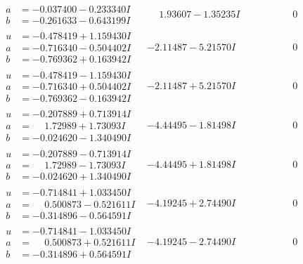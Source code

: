 \documentclass[1p]{elsarticle_modified}
\theoremstyle{definition}
\begin{document}
$$\begin{array}{c|c|c}
\begin{aligned}
a &= -0.037400 - 0.233340 I \\
b &= -0.261633 - 0.643199 I\end{aligned}
 & \phantom{-}1.93607 - 1.35235 I & \phantom{-0.000000 } 0 \\ \hline\begin{aligned}
u &= -0.478419 + 1.159430 I \\
a &= -0.716340 - 0.504402 I \\
b &= -0.769362 + 0.163942 I\end{aligned}
 & -2.11487 - 5.21570 I & \phantom{-0.000000 } 0 \\ \hline\begin{aligned}
u &= -0.478419 - 1.159430 I \\
a &= -0.716340 + 0.504402 I \\
b &= -0.769362 - 0.163942 I\end{aligned}
 & -2.11487 + 5.21570 I & \phantom{-0.000000 } 0 \\ \hline\begin{aligned}
u &= -0.207889 + 0.713914 I \\
a &= \phantom{-}1.72989 + 1.73093 I \\
b &= -0.024620 - 1.340490 I\end{aligned}
 & -4.44495 - 1.81498 I & \phantom{-0.000000 } 0 \\ \hline\begin{aligned}
u &= -0.207889 - 0.713914 I \\
a &= \phantom{-}1.72989 - 1.73093 I \\
b &= -0.024620 + 1.340490 I\end{aligned}
 & -4.44495 + 1.81498 I & \phantom{-0.000000 } 0 \\ \hline\begin{aligned}
u &= -0.714841 + 1.033450 I \\
a &= \phantom{-}0.500873 - 0.521611 I \\
b &= -0.314896 - 0.564591 I\end{aligned}
 & -4.19245 + 2.74490 I & \phantom{-0.000000 } 0 \\ \hline\begin{aligned}
u &= -0.714841 - 1.033450 I \\
a &= \phantom{-}0.500873 + 0.521611 I \\
b &= -0.314896 + 0.564591 I\end{aligned}
 & -4.19245 - 2.74490 I & \phantom{-0.000000 } 0 \\ \hline\begin{aligned}

\end{aligned}
\end{array}$$
\end{document}
